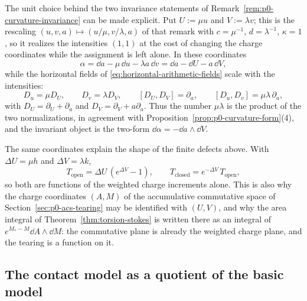 \begin{remark}
\label{rem:p0-weighted-charges}
The unit choice behind the two invariance statements of
Remark~\ref{rem:p0-curvature-invariance} can be made explicit.  Put
$U:=\mu u$ and $V:=\lambda v$; this is the rescaling
$(u,v,a)\mapsto(u/\mu,v/\lambda,a)$ of that remark with $c=\mu^{-1}$,
$d=\lambda^{-1}$, $\kappa=1$, so it realizes the intensities $(1,1)$ at the cost of
changing the charge coordinates while the assignment is left alone.  In these
coordinates
\begin{equation}
 \alpha=\dd a-\mu\,\dd u-\lambda a\,\dd v=\dd a-\dd U-a\,\dd V,
 \label{eq:p0-weighted-contact-form}
\end{equation}
while the horizontal fields of \eqref{eq:horizontal-arithmetic-fields} scale with
the intensities:
\begin{equation}
 D_u=\mu D_U,
 \qquad
 D_v=\lambda D_V,
 \qquad
 [D_U,D_V]=\partial_a,
 \qquad
 [D_u,D_v]=\mu\lambda\,\partial_a ,
 \label{eq:p0-weighted-fields}
\end{equation}
with $D_U=\partial_U+\partial_a$ and $D_V=\partial_V+a\partial_a$.  Thus the number
$\mu\lambda$ is the product of the two normalizations, in agreement with
Proposition~\ref{prop:p0-curvature-form}(4), and
the invariant object is the two-form $\dd\alpha=-\dd a\wedge\dd V$.

The same coordinates explain the shape of the finite defects above.  With
$\Delta U=\mu h$ and $\Delta V=\lambda k$,
\begin{equation}
 T_{\mathrm{open}}=\Delta U\,(e^{\Delta V}-1),
 \qquad
 T_{\mathrm{closed}}=e^{-\Delta V}\,T_{\mathrm{open}} ,
 \label{eq:p0-weighted-defects}
\end{equation}
so both are functions of the weighted charge increments alone.  This is also why
the charge coordinates $(A,M)$ of the accumulative commutative space of
Section~\ref{sec:p0-acs-tearing} may be identified with $(U,V)$, and why the area
integral of Theorem~\ref{thm:torsion-stokes} is written there as an integral of
$e^{M_*-M}\dd A\wedge\dd M$: the commutative plane is already the weighted charge
plane, and the tearing is a function on it.
\end{remark}

\subsection{The contact model as a quotient of the basic model}
\label{subsec:p0-contact-quotient}

